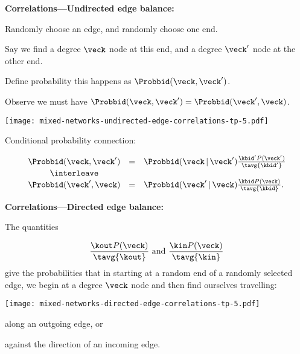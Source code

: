    


  \textbf{Correlations---Undirected edge balance:}

  
   
    Randomly choose an edge, and randomly choose one end.
   
    Say we find a degree $\veck$ node at this end,
    and a degree $\veck'$ node at the other end.
   
    Define probability this happens as $\Probbid(\veck, \veck')$.
   
    Observe we must have $\Probbid(\veck, \veck') = \Probbid(\veck', \veck)$.
  

              
        \texttt{[image: mixed-networks-undirected-edge-correlations-tp-5.pdf]}
        
        
        
          Conditional probability connection:        
        
        {
        $$
        \begin{array}{ccl}
          \Probbid(\veck, \veck')
          &
          = 
          &
          \Probbid(\veck\, |\, \veck') 
          \frac{\kbid' P(\veck')}{\tavg{\kbid'}}
          \\
          \interleave
          & & \\
          \Probbid(\veck', \veck)
          &
          = 
          &
          \Probbid(\veck'\, |\, \veck) 
          \frac{\kbid P(\veck)}{\tavg{\kbid}}.
        \end{array}
        $$
      }
      

  \textbf{Correlations---Directed edge balance:}

    
     
      The quantities
              
        $$
        \frac{\kout P(\veck)}{\tavg{\kout}}
        \ \mbox{and} \
        \frac{\kin P(\veck)}{\tavg{\kin}}
        $$
      give the probabilities
      that in starting at a random end
      of a randomly selected edge,
      we begin at a degree $\veck$ node
      and then
      find ourselves travelling:
        
        \texttt{[image: mixed-networks-directed-edge-correlations-tp-5.pdf]}
            
       
        along an outgoing edge, or
       
        against the direction of an incoming edge.
      
